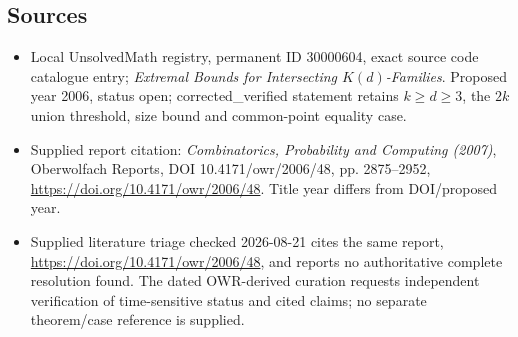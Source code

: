 \documentclass[11pt]{article}
\begin{document}
\subsection{Sources}
\begin{itemize}
\item Local UnsolvedMath registry, permanent ID 30000604, exact source code catalogue entry; \emph{Extremal Bounds for Intersecting $K(d)$-Families}. Proposed year 2006, status open; corrected\_verified statement retains $k\geq d\geq3$, the $2k$ union threshold, size bound and common-point equality case.
\item Supplied report citation: \emph{Combinatorics, Probability and Computing (2007)}, Oberwolfach Reports, DOI 10.4171/owr/2006/48, pp. 2875--2952, \url{https://doi.org/10.4171/owr/2006/48}. Title year differs from DOI/proposed year.
\item Supplied literature triage checked 2026-08-21 cites the same report, \url{https://doi.org/10.4171/owr/2006/48}, and reports no authoritative complete resolution found. The dated OWR-derived curation requests independent verification of time-sensitive status and cited claims; no separate theorem/case reference is supplied.
\end{itemize}
\end{document}
